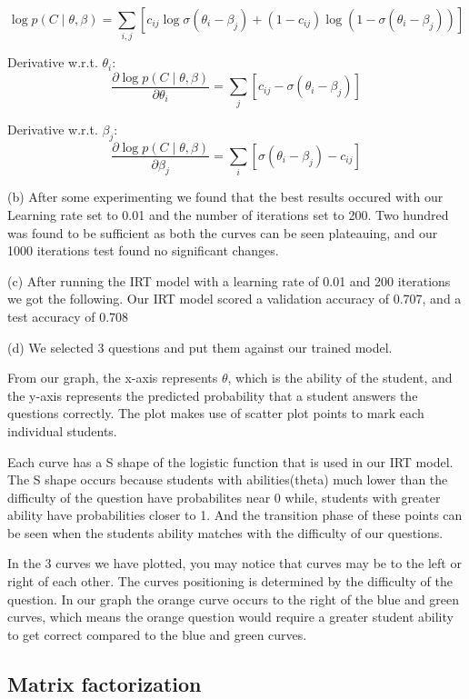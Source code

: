 \documentclass[twocolumn]{article}
\begin{document}
\[
\log p(C \mid \theta, \beta)
= \sum_{i,j} \left[ c_{ij} \log \sigma(\theta_i - \beta_j)
+ (1 - c_{ij}) \log (1 - \sigma(\theta_i - \beta_j)) \right]
\]

Derivative w.r.t. \(\theta_i\):
\[
\frac{\partial \log p(C \mid \theta, \beta)}{\partial \theta_i}
= \sum_j \left[ c_{ij} - \sigma(\theta_i - \beta_j) \right]
\]

Derivative w.r.t. \(\beta_j\):
\[
\frac{\partial \log p(C \mid \theta, \beta)}{\partial \beta_j}
= \sum_i \left[ \sigma(\theta_i - \beta_j) - c_{ij} \right]
\]


\item 
(b) After some experimenting we found that the best results occured with our Learning rate
set to 0.01 and the number of iterations set to 200. Two hundred was found to be sufficient
as both the curves can be seen plateauing, and our 1000 iterations test found no significant changes.


\item 
(c) After running the IRT model with a learning rate of 0.01 and 200 iterations we got the following.
Our IRT model scored a validation accuracy of 0.707, and a test accuracy of 0.708

\item 
(d) We selected 3 questions and put them against our trained model. 

From our graph, the x-axis represents $\theta$, which is the ability of the student, and the y-axis represents the predicted probability that a student answers the questions correctly. The plot makes use of scatter plot points to mark each individual students.

Each curve has a S shape of the logistic function that is used in our IRT model. The S shape occurs because students with abilities(theta) much lower than the difficulty of the question have probabilites near 0 while, students with greater ability have probabilities closer to 1. And the transition phase of these points can be seen when the students ability matches with the difficulty of our questions. 

In the 3 curves we have plotted, you may notice that curves may be to the left or right of each other. The curves positioning is determined by the difficulty of the question. In our graph the orange curve occurs to the right of the blue and green curves, which means the orange question would require a greater student ability to get correct compared to the blue and green curves. 


\subsection{Matrix factorization}
\end{document}
